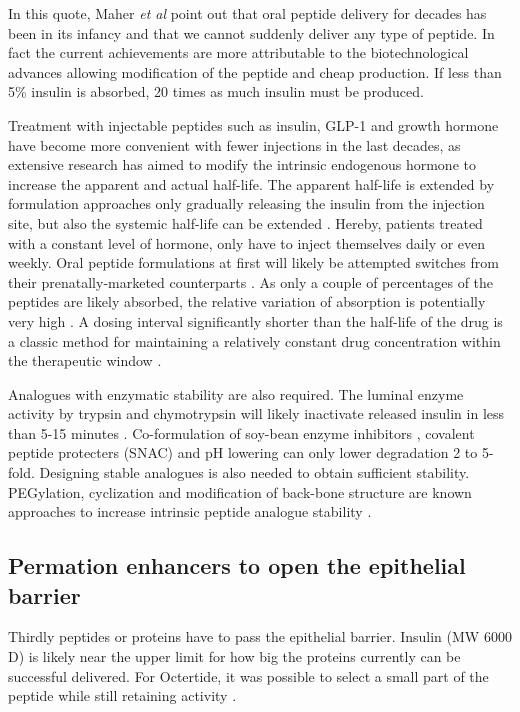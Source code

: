 In this quote, Maher \textit{et al} point out that oral peptide delivery for decades has been in its infancy and that we cannot suddenly deliver any type of peptide. In fact the current achievements are more attributable to the biotechnological advances allowing modification of the peptide and cheap production. If less than 5\% insulin is absorbed, 20 times as much insulin must be produced.

Treatment with injectable peptides such as insulin, GLP-1 and growth hormone have become more convenient with fewer injections in the last decades, as extensive research has aimed to modify the intrinsic endogenous hormone to increase the apparent and actual half-life. The apparent half-life is extended by formulation approaches only gradually releasing the insulin from the injection site, but also the systemic half-life can be extended \cite{arnolds2010pharmacokinetic}. Hereby, patients treated with a constant level of hormone, only have to inject themselves daily or even weekly. Oral peptide formulations at first will likely be attempted switches from their prenatally-marketed counterparts \cite{maher2014formulation}. As only a couple of percentages of the peptides are likely absorbed, the relative variation of absorption is potentially very high \cite{gabor2010improving}. A dosing interval significantly shorter than the half-life of the drug is a classic method for maintaining a relatively constant drug concentration within the therapeutic window \cite{tozer2006introduction}.

Analogues with enzymatic stability are also required. The luminal enzyme activity by trypsin and chymotrypsin will likely inactivate released insulin in less than 5-15 minutes \cite{welling2014citric}. Co-formulation of soy-bean enzyme inhibitors \cite{fujii1985promoting}, covalent peptide protecters (SNAC) \cite{bruno2013basics} and pH lowering \cite{welling2014citric} can only lower degradation 2 to 5-fold. Designing stable analogues is also needed to obtain sufficient stability. PEGylation, cyclization and modification of back-bone structure are known approaches to increase intrinsic peptide analogue stability \cite{bruno2013basics}.

\subsection{Permation enhancers to open the epithelial barrier}
Thirdly peptides or proteins have to pass the epithelial barrier. Insulin (MW 6000 D) is likely near the upper limit for how big the proteins currently can be successful delivered. For Octertide, it was possible to select a small part of the peptide while still retaining activity \cite{aguiree2013idf}. 

